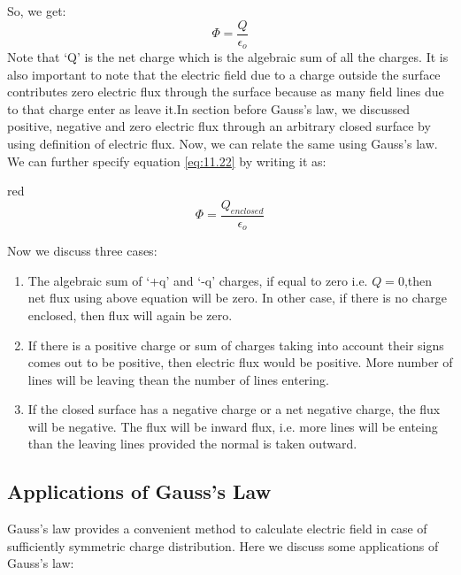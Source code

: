 So, we get:
\begin{equation}\label{eq:11.22}
  \Phi = \frac{Q}{\epsilon_{o}}
\end{equation}
Note that ‘Q’ is the net charge which is the algebraic
sum of all the charges. It is also important to note that the
electric field due to a charge outside the surface contributes zero
electric flux through the surface because as many field lines
due to that charge enter as leave it.In section before Gauss’s law,
we discussed positive, negative and zero electric flux through an
arbitrary closed surface by using definition of electric flux.
Now, we can relate the same using Gauss’s law. We can further specify equation
\ref{eq:11.22} by writing it as:
\begin{mybox}{red}{}
\begin{equation}\label{eq:11.23}
  \Phi = \frac{Q_{enclosed}}{\epsilon_{o}}
\end{equation}
\end{mybox}
Now we discuss three cases:
\begin{enumerate}[label=(\roman*)] 
\item The algebraic sum of ‘+q’ and ‘-q’ charges,
if equal to zero i.e. $Q = 0$,then net flux using above equation 
will be zero. In other case, if there is no charge enclosed, then flux
 will again be zero.
\item If there is a positive charge or sum of charges taking into account
their signs comes out to be positive, then electric flux would be positive.
More number of lines will be leaving thean the number of lines entering.
\item If the closed surface has a negative charge or a net negative charge,
the flux will be negative. The flux will be inward flux, i.e. more lines
will be enteing than the leaving lines provided the normal is taken outward.
\end{enumerate}

\subsection{Applications of Gauss’s Law}
Gauss’s law provides a convenient method to calculate electric field in case of sufficiently symmetric charge distribution.
Here we discuss some applications of Gauss’s law:


